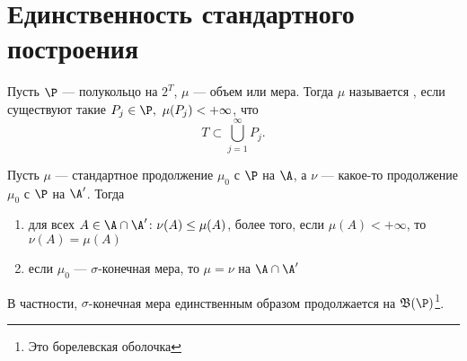 \section{Единственность стандартного построения}
\begin{defn}
	Пусть $ \P$ --- полукольцо на $ 2^{T}$, $ \mu$ --- объем или мера. Тогда $ \mu$ называется , если существуют такие $ P_j \in \P, ~  \mu(P_j) < +\infty$, что
	\[
	T \subset \bigcup_{j=1}^{\infty} P_j
	.\] 
\end{defn}
\begin{thm}
    Пусть $ \mu$ --- стандартное продолжение $ \mu_0 $ с $ \P$ на $ \A$, а  $ \nu $ --- какое-то продолжение  $ \mu_0$ с $ \P$ на $ \A'$. Тогда
	\begin{enumerate}[noitemsep]
		\item для всех $ A \in \A \cap \A'\colon \nu (A) \le \mu(A)$, более того, если $ \mu(A) <+ \infty$, то $ \nu (A) = \mu(A)$ 
		\item если $ \mu_0$ --- $ \sigma $-конечная мера, то $ \mu= \nu $ на $ \A \cap \A'$ 
	\end{enumerate} 
	В частности, $ \sigma $-конечная мера единственным образом продолжается на $ \mathfrak{B}(\P)$\footnote{Это борелевская оболочка}.
\end{thm}
